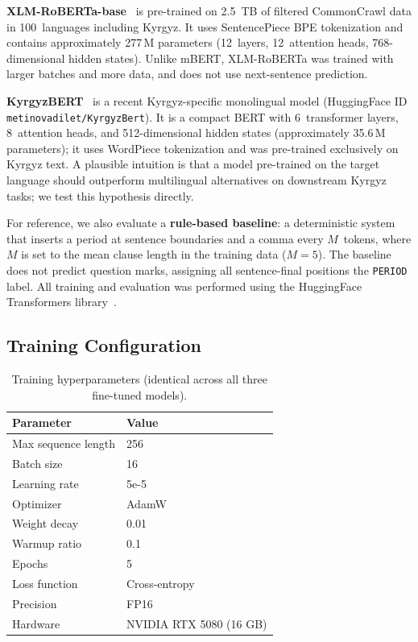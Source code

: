\documentclass[manuscript, review]{acmart}
\begin{document}
\textbf{XLM-RoBERTa-base}~\cite{conneau2020unsupervised} is pre-trained on 2.5~TB of filtered CommonCrawl data in 100~languages including Kyrgyz. It uses SentencePiece BPE tokenization and contains approximately 277\,M parameters (12~layers, 12~attention heads, 768-dimensional hidden states). Unlike mBERT, XLM-RoBERTa was trained with larger batches and more data, and does not use next-sentence prediction.

\textbf{KyrgyzBERT}~\cite{metinov2025kyrgyzbert} is a recent Kyrgyz-specific monolingual model (HuggingFace ID \texttt{metinovadilet/KyrgyzBert}). It is a compact BERT with 6~transformer layers, 8~attention heads, and 512-dimensional hidden states (approximately 35.6\,M parameters); it uses WordPiece tokenization and was pre-trained exclusively on Kyrgyz text. A plausible intuition is that a model pre-trained on the target language should outperform multilingual alternatives on downstream Kyrgyz tasks; we test this hypothesis directly.

For reference, we also evaluate a \textbf{rule-based baseline}: a deterministic system that inserts a period at sentence boundaries and a comma every $M$~tokens, where $M$ is set to the mean clause length in the training data ($M=5$). The baseline does not predict question marks, assigning all sentence-final positions the \texttt{PERIOD} label. All training and evaluation was performed using the HuggingFace Transformers library~\cite{wolf2019huggingface}.

\subsection{Training Configuration}

\begin{table}[t]
\caption{Training hyperparameters (identical across all three fine-tuned models).}
\label{tab:hyperparams}
\begin{tabular}{ll}
\toprule
\textbf{Parameter} & \textbf{Value} \\
\midrule
Max sequence length     & 256 \\
Batch size              & 16 \\
Learning rate           & 5e-5 \\
Optimizer               & AdamW \\
Weight decay            & 0.01 \\
Warmup ratio            & 0.1 \\
Epochs                  & 5 \\
Loss function           & Cross-entropy \\
Precision               & FP16 \\
Hardware                & NVIDIA RTX 5080 (16 GB) \\
\bottomrule
\end{tabular}
\end{table}
\end{document}

